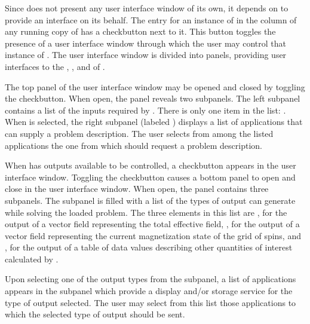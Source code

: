 Since  does not present
any user interface window of its own, it depends on
 to provide an interface on
its behalf.  The entry for an instance of  in the
 column of any running copy of
 has a checkbutton next to it.  This button toggles the
presence of a user interface window through which the user may control
that instance of .  The user interface window is divided
into panels, providing user interfaces to the
, , and  of .

The top panel of the user interface window may be opened and closed
by toggling the  checkbutton.  When open, the
 panel reveals two subpanels.  The left subpanel
contains a list of the inputs required by .  There is
only one item in the list: .  When
 is selected, the right subpanel (labeled
) displays a list of applications
that can supply a problem description.  The user selects from among the
listed applications the one from which  should request a
problem description.

When  has outputs available to be controlled, a
 checkbutton appears in the user interface
window.  Toggling the  checkbutton causes a
bottom panel to open and close in the user interface window.  When open,
the  panel contains three subpanels.  The
 subpanel is filled with a list of the types of output
 can generate while solving the loaded problem.  The
three elements in this list are , for the output of a
vector field representing the total effective
field, , for the output of a vector field
representing the current magnetization state of the grid of spins, and
, for the output of a table of data
values describing other quantities of interest
calculated by .

Upon selecting one of the output types from the  subpanel,
a list of applications appears in the
 subpanel which provide a
display and/or storage service for the type of output selected.  The
user may select from this list those applications to which the selected
type of output should be sent.

